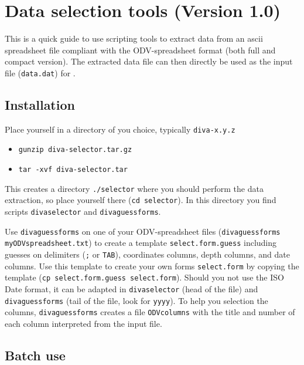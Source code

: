 % 


\section{Data selection tools (Version 1.0)}


This is a quick guide to use scripting tools to extract data from an ascii spreadsheet file compliant with the ODV-spreadsheet format (both full and compact version). The extracted data file can then directly be used as the input file ({\tt data.dat}) for \diva.

\subsection{Installation} 


Place yourself in a directory of you choice, typically {\tt diva-x.y.z}
\begin{itemize}
\item
 {\tt gunzip diva-selector.tar.gz}
 \item 
 {\tt tar -xvf diva-selector.tar} 
 \end{itemize}
This creates a directory {\tt ./selector} where you should perform the data extraction, so place yourself there ({\tt cd selector}). In this directory you find scripts {\tt divaselector} and {\tt divaguessforms}.

Use {\tt divaguessforms} on one of your ODV-spreadsheet files 
({\tt divaguess\-forms myODV\-spread\-sheet\-.txt})
to create a template {\tt select.form.guess} including
guesses on delimiters ({\tt ;} or {\tt TAB}), coordinates columns, depth columns, and date columns. Use this template to create your own forms {\tt select.form} by copying the template ({\tt cp select.form.guess select.form}).
Should you not use the ISO Date format, it can be adapted in {\tt diva\-selector} (head of the file) and {\tt diva\-guessforms} (tail of the file, look for {\tt yyyy}). To help you selection the columns, {\tt diva\-guessforms} creates a file {\tt ODVcolumns} with the title and number of each column interpreted from the input file.
 
\subsection{Batch use}

